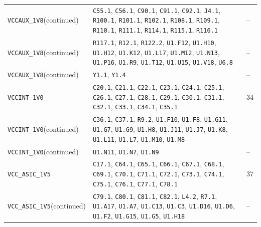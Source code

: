 \documentclass[11pt,a4paper]{article}
\begin{document}
\begin{longtable}{@{}P{48mm}P{109mm}P{10mm}@{}}
\nolinkurl{VCCAUX_1V8}\newline (continued) & \nolinkurl{C55.1}, \nolinkurl{C56.1}, \nolinkurl{C90.1}, \nolinkurl{C91.1}, \nolinkurl{C92.1}, \nolinkurl{J4.1}, \nolinkurl{R100.1}, \nolinkurl{R101.1}, \nolinkurl{R102.1}, \nolinkurl{R108.1}, \nolinkurl{R109.1}, \nolinkurl{R110.1}, \nolinkurl{R111.1}, \nolinkurl{R114.1}, \nolinkurl{R115.1}, \nolinkurl{R116.1} & -- \\
\nolinkurl{VCCAUX_1V8}\newline (continued) & \nolinkurl{R117.1}, \nolinkurl{R12.1}, \nolinkurl{R122.2}, \nolinkurl{U1.F12}, \nolinkurl{U1.H10}, \nolinkurl{U1.H12}, \nolinkurl{U1.K12}, \nolinkurl{U1.L17}, \nolinkurl{U1.M12}, \nolinkurl{U1.N13}, \nolinkurl{U1.P16}, \nolinkurl{U1.R9}, \nolinkurl{U1.T12}, \nolinkurl{U1.U15}, \nolinkurl{U1.V18}, \nolinkurl{U6.8} & -- \\
\nolinkurl{VCCAUX_1V8}\newline (continued) & \nolinkurl{Y1.1}, \nolinkurl{Y1.4} & -- \\
\nolinkurl{VCCINT_1V0} & \nolinkurl{C20.1}, \nolinkurl{C21.1}, \nolinkurl{C22.1}, \nolinkurl{C23.1}, \nolinkurl{C24.1}, \nolinkurl{C25.1}, \nolinkurl{C26.1}, \nolinkurl{C27.1}, \nolinkurl{C28.1}, \nolinkurl{C29.1}, \nolinkurl{C30.1}, \nolinkurl{C31.1}, \nolinkurl{C32.1}, \nolinkurl{C33.1}, \nolinkurl{C34.1}, \nolinkurl{C35.1} & 34 \\
\nolinkurl{VCCINT_1V0}\newline (continued) & \nolinkurl{C36.1}, \nolinkurl{C37.1}, \nolinkurl{R9.2}, \nolinkurl{U1.F10}, \nolinkurl{U1.F8}, \nolinkurl{U1.G11}, \nolinkurl{U1.G7}, \nolinkurl{U1.G9}, \nolinkurl{U1.H8}, \nolinkurl{U1.J11}, \nolinkurl{U1.J7}, \nolinkurl{U1.K8}, \nolinkurl{U1.L11}, \nolinkurl{U1.L7}, \nolinkurl{U1.M10}, \nolinkurl{U1.M8} & -- \\
\nolinkurl{VCCINT_1V0}\newline (continued) & \nolinkurl{U1.N11}, \nolinkurl{U1.N7}, \nolinkurl{U1.N9} & -- \\
\nolinkurl{VCC_ASIC_1V5} & \nolinkurl{C17.1}, \nolinkurl{C64.1}, \nolinkurl{C65.1}, \nolinkurl{C66.1}, \nolinkurl{C67.1}, \nolinkurl{C68.1}, \nolinkurl{C69.1}, \nolinkurl{C70.1}, \nolinkurl{C71.1}, \nolinkurl{C72.1}, \nolinkurl{C73.1}, \nolinkurl{C74.1}, \nolinkurl{C75.1}, \nolinkurl{C76.1}, \nolinkurl{C77.1}, \nolinkurl{C78.1} & 37 \\
\nolinkurl{VCC_ASIC_1V5}\newline (continued) & \nolinkurl{C79.1}, \nolinkurl{C80.1}, \nolinkurl{C81.1}, \nolinkurl{C82.1}, \nolinkurl{L4.2}, \nolinkurl{R7.1}, \nolinkurl{U1.A17}, \nolinkurl{U1.A7}, \nolinkurl{U1.C13}, \nolinkurl{U1.C3}, \nolinkurl{U1.D16}, \nolinkurl{U1.D6}, \nolinkurl{U1.F2}, \nolinkurl{U1.G15}, \nolinkurl{U1.G5}, \nolinkurl{U1.H18} & -- \\

\end{longtable}
\end{document}
